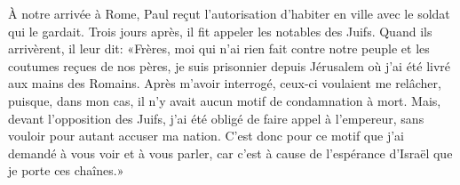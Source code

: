 À notre arrivée à Rome,
	Paul reçut l’autorisation d’habiter en ville avec le soldat qui le gardait.
Trois jours après, il fit appeler les notables des Juifs.
Quand ils arrivèrent, il leur dit:
	«Frères, moi qui n’ai rien fait contre notre peuple
		et les coutumes reçues de nos pères,
	je suis prisonnier depuis Jérusalem où j’ai été livré aux mains des Romains.
Après m’avoir interrogé, ceux-ci voulaient me relâcher,
	puisque, dans mon cas, il n’y avait aucun motif de condamnation à mort.
Mais, devant l’opposition des Juifs,
	j’ai été obligé de faire appel à l’empereur,
	sans vouloir pour autant accuser ma nation.
C’est donc pour ce motif que j’ai demandé à vous voir et à vous parler,
	car c’est à cause de l’espérance d’Israël que je porte ces chaînes.»
